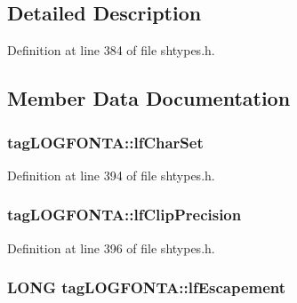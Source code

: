 \subsection{Detailed Description}


Definition at line 384 of file shtypes.\+h.



\subsection{Member Data Documentation}
\subsubsection[{\texorpdfstring{lf\+Char\+Set}{lfCharSet}}]{ tag\+L\+O\+G\+F\+O\+N\+T\+A\+::lf\+Char\+Set}\hypertarget{structtag_l_o_g_f_o_n_t_a_ab2bddca4d4d8a96b7055161a5bd168d2}{}\label{structtag_l_o_g_f_o_n_t_a_ab2bddca4d4d8a96b7055161a5bd168d2}


Definition at line 394 of file shtypes.\+h.

\subsubsection[{\texorpdfstring{lf\+Clip\+Precision}{lfClipPrecision}}]{ tag\+L\+O\+G\+F\+O\+N\+T\+A\+::lf\+Clip\+Precision}\hypertarget{structtag_l_o_g_f_o_n_t_a_af226b853d3bf83929536361f970c2e31}{}\label{structtag_l_o_g_f_o_n_t_a_af226b853d3bf83929536361f970c2e31}


Definition at line 396 of file shtypes.\+h.

\subsubsection[{\texorpdfstring{lf\+Escapement}{lfEscapement}}]{\setlength{\rightskip}{0pt plus 5cm}L\+O\+NG tag\+L\+O\+G\+F\+O\+N\+T\+A\+::lf\+Escapement}\hypertarget{structtag_l_o_g_f_o_n_t_a_abd471112e5265cbaa79bcfe1ec54be1c}{}\label{structtag_l_o_g_f_o_n_t_a_abd471112e5265cbaa79bcfe1ec54be1c}


